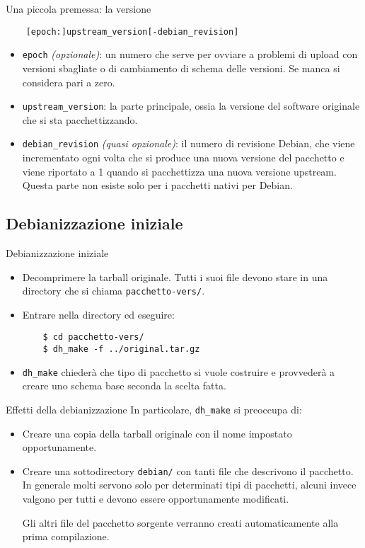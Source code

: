\documentclass{beamer}
\begin{document}
\begin{frame}[fragile]{Una piccola premessa: la versione}
	\begin{verbatim}
	[epoch:]upstream_version[-debian_revision]
	\end{verbatim}
	\begin{itemize}
	\item<4-> {\tt epoch} {\itshape (opzionale)}: un numero che serve per ovviare a problemi di upload con versioni sbagliate o di cambiamento di schema delle versioni. Se manca si considera pari a zero.
	\item<2-> {\tt upstream\_version}: la parte principale, ossia la versione del software originale che si sta pacchettizzando.
	\item<3-> {\tt debian\_revision} {\itshape (quasi opzionale)}: il numero di revisione Debian, che viene incrementato ogni volta che si produce una nuova versione del pacchetto e viene riportato a 1 quando si pacchettizza una nuova versione upstream. Questa parte non esiste solo per i pacchetti nativi per Debian.
	\end{itemize}
\end{frame}

\subsection{Debianizzazione iniziale}

\begin{frame}[fragile]{Debianizzazione iniziale}
	\begin{itemize}
	\item Decomprimere la tarball originale. Tutti i suoi file devono stare in una directory che si chiama {\tt pacchetto-vers/}.
	\pause
	\item Entrare nella directory ed eseguire:
	\begin{verbatim}
	$ cd pacchetto-vers/
	$ dh_make -f ../original.tar.gz
	\end{verbatim}
	\pause
	\item {\tt dh\_make} chiederà che tipo di pacchetto si vuole costruire e provvederà a creare uno schema base seconda la scelta fatta.
	\end{itemize}
\end{frame}

\begin{frame}{Effetti della debianizzazione}
	In particolare, {\tt dh\_make} si preoccupa di:
	\begin{itemize}
		\item Creare una copia della tarball originale con il nome impostato opportunamente.
		\pause
		\item Creare una sottodirectory {\tt debian/} con tanti file che descrivono il pacchetto. In generale molti servono solo per determinati tipi di pacchetti, alcuni invece valgono per tutti e devono essere opportunamente modificati.

		\pause
		Gli altri file del pacchetto sorgente verranno creati automaticamente alla prima compilazione.
	\end{itemize}
\end{frame}
\end{document}
